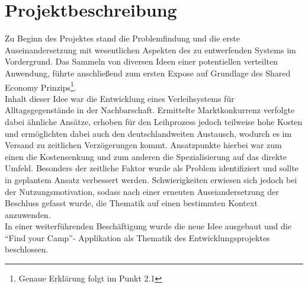 
\chapter{Projektbeschreibung}

Zu Beginn des Projektes stand die Problemfindung und die erste Auseinandersetzung mit wesentlichen Aspekten des zu entwerfenden Systems im Vordergrund. Das Sammeln von diversen Ideen einer potentiellen verteilten Anwendung, führte anschließend zum ersten Expose auf Grundlage des Shared Economy Prinzips\footnote{Genaue Erklärung folgt im Punkt 2.1}.\\
Inhalt dieser Idee war die Entwicklung eines Verleihsystems für Alltagsgegenstände in der Nachbarschaft. Ermittelte Marktkonkurrenz verfolgte dabei ähnliche Ansätze, erhoben für den Leihprozess jedoch teilweise hohe Kosten und ermöglichten dabei auch den deutschlandweiten Austausch, wodurch es im Versand zu zeitlichen Verzögerungen kommt.
Ansatzpunkte hierbei war zum einen die Kostensenkung und zum anderen die Spezialisierung auf das direkte Umfeld. Besonders der zeitliche Faktor wurde als Problem identifiziert und sollte in geplantem Ansatz verbessert werden. Schwierigkeiten erwiesen sich jedoch bei der Nutzungsmotivation, sodass nach einer erneuten Auseiandersetzung der Beschluss gefasst wurde, die Thematik auf einen bestimmten Kontext anzuwenden.\\   
In einer weiterführenden Beschäftigung wurde die neue Idee ausgebaut und die “Find your Camp”- Applikation als Thematik des Entwicklungsprojektes beschlossen. 



\newpage



\newpage



\newpage



\newpage




